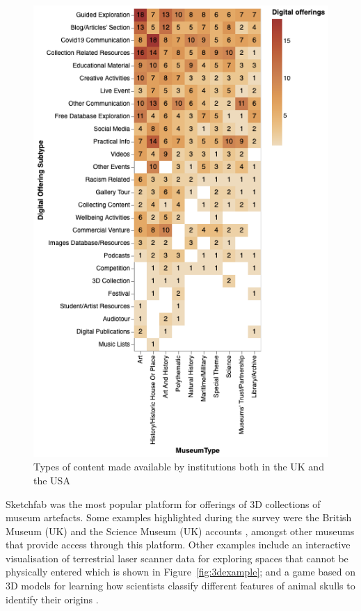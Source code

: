 \documentclass{egpubl}
\begin{document}
\begin{figure}[h]
  \centering
  \includegraphics[width=\linewidth]{images/typescontent.png}
  \caption{\label{fig:contenttype}
            Types of content made available by institutions both in the UK and the USA}
\end{figure}


Sketchfab was the most popular platform for offerings of 3D collections of museum artefacts. Some examples highlighted during the survey were the British Museum (UK) and the Science Museum (UK) accounts  \cite{britishsketchfab, ScienceMuseumsketchfab}, amongst other museums that provide access through this platform. Other examples include an interactive visualisation of terrestrial laser scanner data for exploring spaces that cannot be physically entered \cite{vizcayalidar} which is shown in  Figure~\ref{fig:3dexample}; and a game based on 3D models for learning how scientists classify different features of animal skulls to identify their origins \cite{scieskull}.
\end{document}
